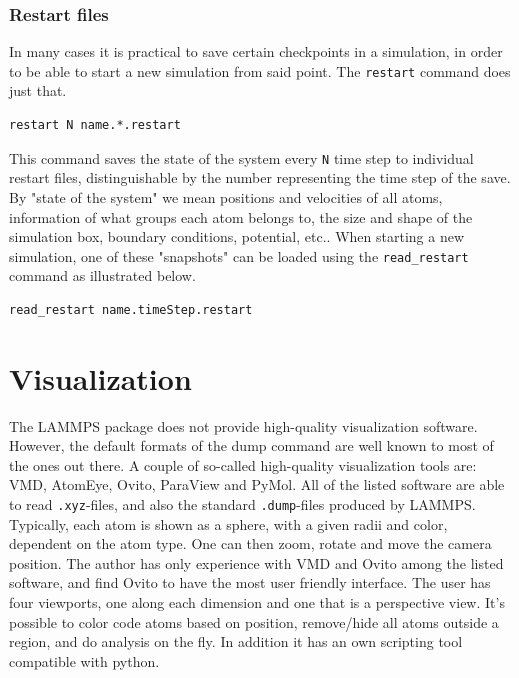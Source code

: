 \documentclass[twoside,english]{uiofysmaster}
\begin{document}
\subsubsection{Restart files}
In many cases it is practical to save certain checkpoints in a simulation, in order to be able to start a new simulation from said point. 
The \texttt{restart} command does just that. 
\begin{lstlisting}[language=LammpsInput]
restart N name.*.restart
\end{lstlisting} 
This command saves the state of the system every \texttt{N} time step to individual restart files, distinguishable by the number representing the time step of the save. 
By "state of the system" we mean positions and velocities of all atoms, information of what groups each atom belongs to, the size and shape of the simulation box, boundary conditions, potential,  etc.. 
When starting a new simulation, one of these "snapshots" can be loaded using the \texttt{read\_restart} command as illustrated below.
\begin{lstlisting}[language=LammpsInput]
read_restart name.timeStep.restart
\end{lstlisting} 



\section{Visualization}
The LAMMPS package does not provide high-quality visualization software. However, the default formats of the dump command are well known to most of the ones out there. 
A couple of so-called high-quality visualization tools are: VMD, AtomEye, Ovito, ParaView and PyMol.
All of the listed software are able to read \texttt{.xyz}-files, and also the standard \texttt{.dump}-files produced by LAMMPS.
Typically, each atom is shown as a sphere, with a given radii and color, dependent on the atom type.
One can then zoom, rotate and move the camera position. 
The author has only experience with VMD and Ovito among the listed software, and find Ovito to have the most user friendly interface.
The user has four viewports, one along each dimension and one that is a perspective view.
It's possible to color code atoms based on position, remove/hide all atoms outside a region, and do analysis on the fly. 
In addition it has an own scripting tool compatible with python. 
\end{document}
